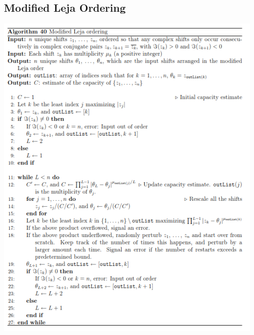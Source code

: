 \documentclass{scrartcl}
\numberwithin{equation}{section}
\begin{document}
\begin{appendices}
\section{Modified Leja Ordering}\label{app:MLO}
\begin{center}
	\includegraphics[scale=1.3]{ModifiedLejaOrdering.png}
\end{center}

\end{appendices}
\end{document}
